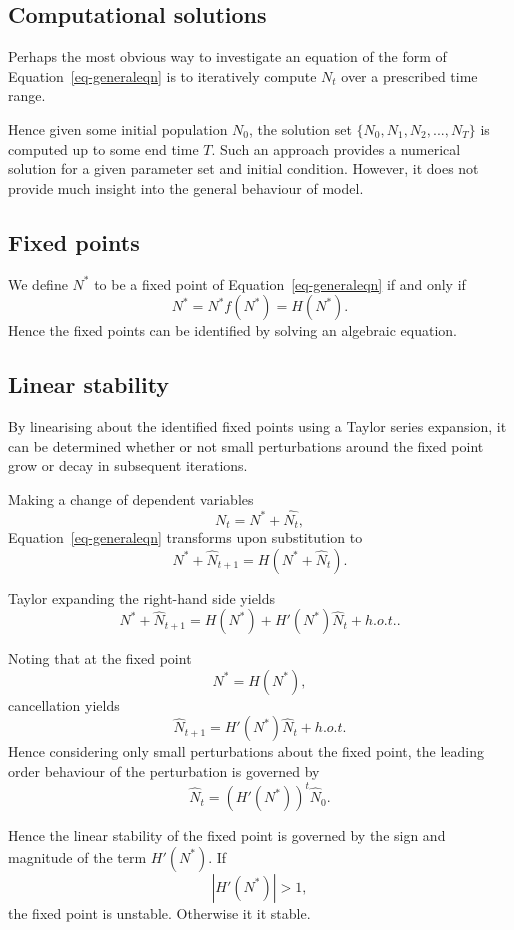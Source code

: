 \documentclass[
  letterpaper,
  DIV=11,
  numbers=noendperiod]{scrreprt}
\begin{document}
\subsection{Computational solutions}\label{computational-solutions-1}

Perhaps the most obvious way to investigate an equation of the form of
Equation~\ref{eq-generaleqn} is to iteratively compute \(N_t\) over a
prescribed time range.

Hence given some initial population \(N_0\), the solution set
\(\{N_0,N_1,N_2,...,N_T\}\) is computed up to some end time \(T\). Such
an approach provides a numerical solution for a given parameter set and
initial condition. However, it does not provide much insight into the
general behaviour of model.

\subsection{Fixed points}\label{fixed-points}

We define \(N^*\) to be a fixed point of Equation~\ref{eq-generaleqn} if
and only if \[ 
N^*=N^*f(N^*)=H(N^*).
\] Hence the fixed points can be identified by solving an algebraic
equation.

\subsection{Linear stability}\label{linear-stability}

By linearising about the identified fixed points using a Taylor series
expansion, it can be determined whether or not small perturbations
around the fixed point grow or decay in subsequent iterations.

Making a change of dependent variables \[
N_t=N^*+\hat{N_t},
\] Equation~\ref{eq-generaleqn} transforms upon substitution to \[
N^*+\hat{N}_{t+1} =  H(N^*+\hat{N}_t). 
\]

Taylor expanding the right-hand side yields \[
N^*+\hat{N}_{t+1}= H(N^*)+H'(N^*)\hat{N}_t + h.o.t. .
\]

Noting that at the fixed point \[
N^*= H(N^*), 
\] cancellation yields \[
\hat{N}_{t+1} = H'(N^*)\hat{N}_t + h.o.t. 
\] Hence considering only small perturbations about the fixed point, the
leading order behaviour of the perturbation is governed by \[
\hat{N}_{t} = (H'(N^*))^t\hat{N}_0.
\]

Hence the linear stability of the fixed point is governed by the sign
and magnitude of the term \(H'(N^*)\). If \[
 |H'(N^*)| >1,
\] the fixed point is unstable. Otherwise it it stable.
\end{document}
